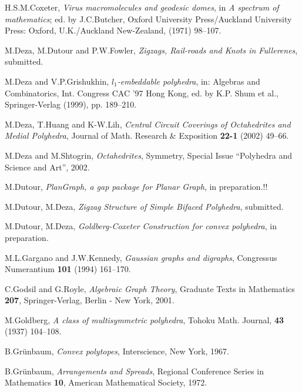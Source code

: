 \documentclass[12pt]{article}
\begin{document}
\begin{remark!!}
\begin{thebibliography}{99}



H.S.M.Coxeter, {\em Virus macromolecules and geodesic domes}, in {\em A spectrum of mathematics}; ed. by J.C.Butcher, Oxford University Press/Auckland University Press: Oxford, U.K./Auckland New-Zealand, (1971) 98--107.


M.Deza, M.Dutour and P.W.Fowler,
{\em Zigzags, Rail-roads and Knots in Fullerenes},
submitted.


M.Deza and V.P.Grishukhin,
{\em $l_1$-embeddable polyhedra},
in: Algebras and Combinatorics, Int. Congress CAC '97 Hong Kong,
ed. by K.P. Shum et al., Springer-Verlag (1999), pp. 189--210.


M.Deza, T.Huang and K-W.Lih,
{\em Central Circuit Coverings of Octahedrites and Medial Polyhedra},
Journal of Math. Research \& Exposition {\bf 22-1} (2002) 49--66.


M.Deza and M.Shtogrin,
{\em Octahedrites}, 
Symmetry, Special Issue ``Polyhedra and Science and Art'', 2002.


M.Dutour, {\em PlanGraph, a gap package for Planar Graph}, 
in preparation.!!


M.Dutour, M.Deza, {\em Zigzag Structure of Simple Bifaced Polyhedra}, submitted.


M.Dutour, M.Deza, {\em Goldberg-Coxeter Construction for convex polyhedra}, in preparation.


M.L.Gargano and J.W.Kennedy,
{\em Gaussian graphs and digraphs}, Congressus Numerantium {\bf 101}
(1994) 161--170.


C.Godsil and G.Royle, {\em Algebraic Graph Theory}, Graduate Texts in 
Mathematics {\bf 207}, Springer-Verlag, Berlin - New York, 2001.


M.Goldberg, {\em A class of multisymmetric polyhedra}, Tohoku Math.
Journal, {\bf 43} (1937) 104--108.


B.Gr\"{u}nbaum, {\em Convex polytopes}, Interscience, New York, 1967.


B.Gr\"{u}nbaum, {\em Arrangements and Spreads}, Regional Conference Series in
Mathematics {\bf 10}, American Mathematical Society, 1972.



\end{thebibliography}
\end{remark!!}
\end{document}
